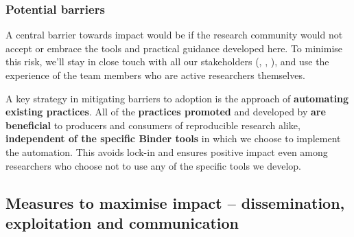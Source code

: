\subsubsection{Potential barriers}

A central barrier towards impact would be if the research community would not
accept or embrace the tools and practical guidance developed here.
To minimise this risk, we'll stay in close touch with all our stakeholders
(, , ), and use
the experience of the team members who are active researchers themselves.

A key strategy in mitigating barriers to adoption is the approach of \textbf{automating existing practices}.
All of the \textbf{practices promoted} and developed by \TheProject \textbf{are beneficial} to
producers and consumers of reproducible research alike,
\textbf{independent of the specific Binder tools} in which we choose to implement the automation.
This avoids lock-in and ensures positive impact even among researchers who choose not to use any of the specific tools we develop.

\subsection{Measures to maximise impact -- dissemination, exploitation and communication}


